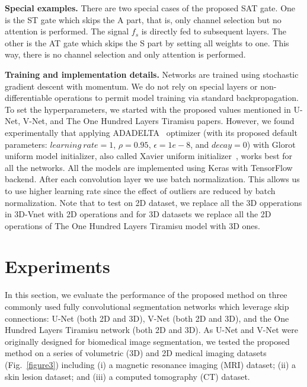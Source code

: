 \documentclass{article}
\begin{document}
\noindent \textbf{Special examples.} There are two special cases of the proposed SAT gate. One is the ST gate which skips the A part, that is, only channel selection but no attention is performed. The signal $f_s$ is directly fed to subsequent layers. The other is the AT gate which skips the S part by setting all weights to one. This way, there is no channel selection and only attention is performed.

\noindent \textbf{Training and implementation details.} Networks are trained using stochastic gradient descent with momentum. We do not rely on special layers or non-differentiable operations to permit model training via standard backpropagation. To set the hyperparameters, we started with the proposed values mentioned in U-Net, V-Net, and The One Hundred Layers Tiramisu papers. However, we found experimentally that applying ADADELTA~\cite{zeiler2012adadelta} optimizer (with its proposed default parameters: $learning \ rate=1$, $\rho=0.95$, $\epsilon=1e-8$, and $decay=0$) with Glorot uniform model initializer, also called Xavier uniform initializer~\cite{glorot2010understanding}, works best for all the networks. All the models are implemented using Keras with TensorFlow backend. After each convolution layer we use batch normalization. This allows us to use higher learning rate since the effect of outliers are reduced by batch normalization. Note that to test on 2D dataset, we replace all the 3D opperations in 3D-Vnet with 2D operations and for 3D datasets we replace all the 2D operations of The One Hundred Layers Tiramisu model with 3D ones. 


\section{Experiments}
In this section, we evaluate the performance of the proposed method on three commonly used fully convolutional segmentation networks which leverage skip connections: U-Net (both 2D and 3D), V-Net (both 2D and 3D), and the One Hundred Layers Tiramisu network (both 2D and 3D). As U-Net and V-Net were originally designed for biomedical image segmentation, we tested the proposed method on a series of volumetric (3D) and 2D medical imaging datasets (Fig.~\ref{figure3}) including (i) a magnetic resonance imaging (MRI) dataset; (ii) a skin lesion dataset; and (iii) a computed tomography (CT) dataset.
\end{document}
